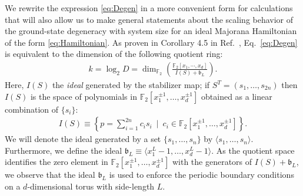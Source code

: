 \documentclass[aps,twocolumn,preprintnumbers,floatfix,showpacs,prx]{revtex4-1}
\begin{document}
We rewrite the expression \eqref{eq:Degen} in a more convenient form for calculations
that will also allow us to make general statements about the scaling behavior of the ground-state degeneracy
with system size for an ideal Majorana Hamiltonian of the form \eqref{eq:Hamiltonian}.
As proven in Corollary 4.5 in Ref.~\cite{Haah_Commuting_Pauli},
Eq.~\eqref{eq:Degen} is equivalent to the dimension of the following quotient ring:
\begin{align}\label{eq:Quotient_Degeneracy}
k = \log_{2} D = \dim_{\mathbb{F}_{2}}\left(\frac{\mathbb{F}_{2}[x_{1},\cdots,x_{d}]}{I(S)+ \mathfrak{b}_{L}}\right).
\end{align}
Here, $I(S)$ the \emph{ideal} generated by the stabilizer map;
if $S^{T} = (s_{1}, \ldots, s_{2n})$ then $I(S)$ is the space of polynomials in $\mathbb{F}_{2}[x_1^{\pm 1},\ldots,x_d^{\pm 1}]$
obtained as a linear combination of $\{ s_i \}$:
\begin{align}
I(S) \equiv \left\{ p = \sum_{i=1}^{2n} c_i s_i \,\,\,\Bigg|\,\,\, c_{i} \in \mathbb{F}_2[x_1^{\pm 1},\ldots,x_d^{\pm1}]\right\}.
\end{align}
We will denote the ideal generated by a set $\{s_{1},\ldots, s_{n}\}$
by $\langle s_1,\ldots, s_{n} \rangle$.
Furthermore, we define the ideal $\mathfrak{b}_L \equiv \langle x_1^L - 1, \ldots, x^L_d - 1\rangle$.
As the quotient space identifies the zero element in $\mathbb{F}_{2}[x_1^{\pm1},\ldots,x_d^{\pm1}]$
with the generators of $I(S) + \mathfrak{b}_{L}$,
we observe that the ideal $\mathfrak{b}_{L}$ is used to enforce
the periodic boundary conditions on a $d$-dimensional torus with side-length $L$.  
\end{document}
